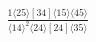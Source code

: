 \documentclass[varwidth, border=5pt]{standalone}
\begin{document}
\begin{my}
$\begin{gathered}
\scriptscriptstyle\frac{1⟨25⟩[34]⟨15⟩⟨45⟩}{⟨14⟩^2⟨24⟩[24]⟨35⟩}
\end{gathered}$
\end{my}
\end{document}
